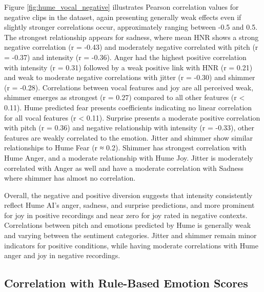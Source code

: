 Figure \ref{fig:hume_vocal_negative} illustrates Pearson correlation values for negative clips in the dataset, again presenting generally weak effects even if slightly stronger correlations occur, approximately ranging between -0.5 and 0.5. 
The strongest relationship appears for sadness, where mean HNR shows a strong negative correlation (r = -0.43) and moderately negative correlated with pitch (r = -0.37) and intensity (r = -0.36). 
Anger had the highest positive correlation with intensity (r = 0.31) followed by a weak positive link with HNR (r = 0.21) and weak to moderate negative correlations with jitter (r = -0.30) and shimmer (r = -0.28). 
Correlations between vocal features and joy are all perceived weak, shimmer emerges as strongest (r = 0.27) compared to all other features (r < 0.11). 
Hume predicted fear presents coefficients indicating no linear correlation for all vocal features (r < 0.11). Surprise presents a moderate positive correlation with pitch (r = 0.36) and negative relationship with intensity (r = -0.33), other features are weakly correlated to the emotion.
Jitter and shimmer show similar relationships to Hume Fear (r ≈ 0.2). Shimmer has strongest correlation with Hume Anger, and a moderate relationship with Hume Joy. Jitter is moderately correlated with Anger as well and have a moderate correlation with Sadness where shimmer has almost no correlation. 

\medskip
Overall, the negative and positive diversion suggests that intensity consistently reflect Hume AI’s anger, sadness, and surprise predictions, and more prominent for joy in positive recordings and near zero for joy rated in negative contexts. 
Correlations between pitch and emotions predicted by Hume is generally weak and varying between the sentiment categories. 
 Jitter and shimmer remain minor indicators for positive conditions, while having moderate correlations with Hume anger and joy in negative recordings.

\subsection{Correlation with Rule-Based Emotion Scores}

